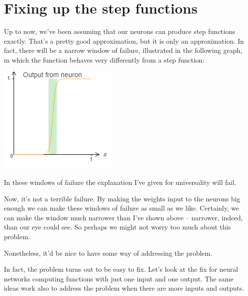 \documentclass[a4paper,twoside,10pt]{book}
\begin{document}
\section{Fixing up the step functions}
Up to now, we've been assuming that our neurons can produce step functions exactly. That's a pretty good approximation, but it is only an approximation. In fact, there will be a narrow window of failure, illustrated in the following graph, in which the function behaves very differently from a step function:
\begin{center}
	\includegraphics[width=0.4\linewidth]{figures/ch4/tikz453}
\end{center}
In these windows of failure the explanation I've given for universality will fail.

Now, it's not a terrible failure. By making the weights input to the neurons big enough we can make these windows of failure as small as we like. Certainly, we can make the window much narrower than I've shown above -- narrower, indeed, than our eye could see. So perhaps we might not worry too much about this problem.

Nonetheless, it'd be nice to have some way of addressing the problem.

In fact, the problem turns out to be easy to fix. Let's look at the fix for neural networks computing functions with just one input and one output. The same ideas work also to address the problem when there are more inputs and outputs.
\end{document}
